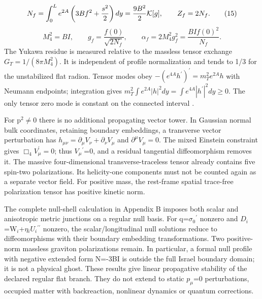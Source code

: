 \documentclass[11pt,a4paper]{article}
\begin{document}
\begin{equation}
N_f=\int_0^Le^{2A}\left(3B f^2+\frac{s^2}{2}\right)dy=\frac{9B^2}{2}{\cal K}[g],\qquad Z_f=2N_f.\tag{15}
\end{equation}
\begin{equation}
M_4^2=BI,\qquad g_f=\frac{f(0)}{\sqrt{2N_f}},\qquad \alpha_f=2M_4^2g_f^2=\frac{BI f(0)^2}{N_f}.\tag{16}
\end{equation}
The Yukawa residue is measured relative to the massless tensor exchange \ensuremath{G_T=1/(8\pi M_4^2)}. It is independent of profile normalization and tends to 1/3 for the unstabilized flat radion. Tensor modes obey \ensuremath{-(e^{4A}h^{\prime})^{\prime}=m_T^2e^{2A}h} with Neumann endpoints; integration gives \ensuremath{m_T^2\int e^{2A}|h|^2dy=\int e^{4A}|h^{\prime}|^2dy\geq0}. The only tensor zero mode is constant on the connected interval \cite{ref14}.

For p\ensuremath{{}^{2}}\ensuremath{\ne}0 there is no additional propagating vector tower. In Gaussian normal bulk coordinates, retaining boundary embeddings, a transverse vector perturbation has \ensuremath{h_{\mu\nu}=\partial_\mu V_\nu+\partial_\nu V_\mu} and \ensuremath{\partial^\mu V_\mu=0}. The mixed Einstein constraint gives \ensuremath{\Box_4 V_\mu^{\prime}=0}; thus \ensuremath{V_\mu}\ensuremath{{}^{\prime}}=0, and a residual tangential diffeomorphism removes it. The massive four-dimensional transverse-traceless tensor already contains five spin-two polarizations. Its helicity-one components must not be counted again as a separate vector field. For positive mass, the rest-frame spatial trace-free polarization tensor has positive kinetic norm.

The complete null-shell calculation in Appendix B imposes both scalar and anisotropic metric junctions on a regular null basis. For q=\ensuremath{\sigma}\ensuremath{{}_{0}}\ensuremath{{}^{\prime}} nonzero and \ensuremath{D_i}=W\ensuremath{{}_{i}}+\ensuremath{\eta}\ensuremath{{}_{i}}\ensuremath{U_i}\ensuremath{{}^{\prime\prime}} nonzero, the scalar/longitudinal null solutions reduce to diffeomorphisms with their boundary embedding transformations. Two positive-norm massless graviton polarizations remain. In particular, a formal null profile with negative extended form N=-3BI is outside the full Israel boundary domain; it is not a physical ghost. These results give linear propagative stability of the declared regular flat branch. They do not extend to static \ensuremath{p_\mu}=0 perturbations, occupied matter with backreaction, nonlinear dynamics or quantum corrections.
\end{document}
